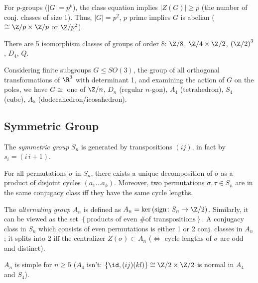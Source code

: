\documentclass{notes}
\begin{document}
\begin{corollary}
    For $p$-groups ($|G|=p^k$), the class equation implies $|Z(G)|\ge p$ (the number of conj. classes of size 1). Thus, $|G|=p^2$, $p$ prime implies $G$ is abelian ($\cong \Z/p\times \Z/p$ or $\Z /p^2 $).
\end{corollary}

\begin{example}
    There are 5 isomorphism classes of groups of order 8: $\Z /8$, $\Z /4\times \Z /2$, $\left( \Z /2 \right) ^3 $, $D_4$, $Q$.
\end{example}

\begin{example}
    Considering finite subgroups $G\le SO(3)$, the group of all orthogonal transformations of $\R ^3 $ with determinant 1, and examining the action of $G$ on the poles, we have $G\cong $ one of $\Z /n$, $D_n$ (regular $n$-gon), $A_4$ (tetrahedron), $S_4$ (cube), $A_5$ (dodecahedron/icosahedron).
\end{example}

\subsection{Symmetric Group}

\begin{theorem}
    The \emph{symmetric group} $S_n$ is generated by transpositions $(ij)$, in fact by $s_i=(i\,i+1)$.
\end{theorem}

\begin{theorem}
    For all permutations $\sigma$ in $S_n$, there exists a unique decomposition of $\sigma$ as a product of disjoint cycles $(a_1\ldots a_k)$. Moreover, two permutations $\sigma,\tau\in S_n$ are in the same conjugacy class iff they have the same cycle lengths. 
\end{theorem}

\begin{defn}
    The \emph{alternating group} $A_n$ is defined as $A_n=\ker \left( \text{sign}\colon S_n \to \Z /2  \right)$. Similarly, it can be viewed as the set $\left\{ \text{products of even \# of transpositions} \right\} $. A conjugacy class in $S_n$ which consists of even permutations is either 1 or 2 conj. classes in $A_n$; it splits into 2 iff the centralizer $Z(\sigma)\subset A_n$ ($\iff $ cycle lengths of $\sigma$ are odd and distinct).
\end{defn}

\begin{theorem}
    $A_n$ is simple for $n\ge 5$ ($A_4$ isn't: $\left\{ \id ,(ij)(kl) \right\} \cong \Z /2\times \Z /2$ is normal in $A_4$ and $S_4$).
\end{theorem}
\end{document}
